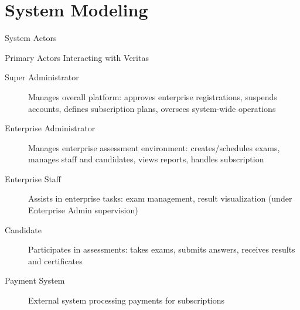 \section{System Modeling}

\begin{frame}{System Actors}
    \begin{block}{Primary Actors Interacting with Veritas}
        \begin{description}
            \item[Super Administrator] Manages overall platform: approves enterprise registrations, suspends accounts, defines subscription plans, oversees system-wide operations
            
            \item[Enterprise Administrator] Manages enterprise assessment environment: creates/schedules exams, manages staff and candidates, views reports, handles subscription
            
            \item[Enterprise Staff] Assists in enterprise tasks: exam management, result visualization (under Enterprise Admin supervision)
            
            \item[Candidate] Participates in assessments: takes exams, submits answers, receives results and certificates
            
            \item[Payment System] External system processing payments for subscriptions
        \end{description}
    \end{block}
\end{frame}

